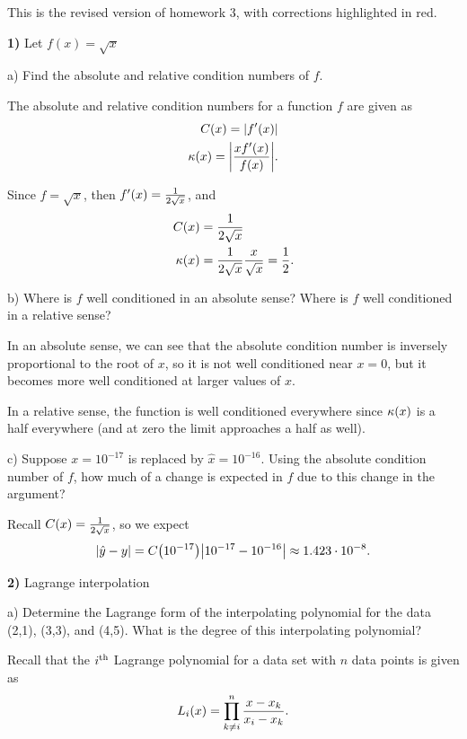 \documentclass[12pt,a4paper]{article}
\newcommand{\prob}[2]{\textbf{#1)} #2}
\begin{document}
This is the revised version of homework 3, with corrections highlighted in red.

\prob{1}{Let $f(x) = \sqrt{x}$}

a) Find the absolute and relative condition numbers of $f$.

The absolute and relative condition numbers for a function $f$ are given as
\begin{align*}
    C\qty(x) = \abs{f'\qty(x) } \\
    \kappa\qty(x) = \abs{\frac{xf'\qty(x)}{f\qty(x) }} 
.\end{align*}

Since 
    $f = \sqrt{x}$, 
then 
    $f'\qty(x) = \frac{1}{2 \sqrt{x}}$,
and
\begin{align*}
    C\qty(x) &= \frac{1}{2\sqrt{x}} \\
    \kappa\qty(x) &= \frac{1}{2\sqrt{x}}\frac{x}{\sqrt{x}} = \frac{1}{2}
.\end{align*}

b) Where is $f$ well conditioned in an absolute sense? Where is $f$ well conditioned in a relative sense?

In an absolute sense, we can see that the absolute condition number is inversely proportional to the root of $x$, so it is not well conditioned near $x = 0$, but it becomes more well conditioned at larger values of $x$.

In a relative sense, the function is well conditioned everywhere since $\kappa\qty(x)$ is a half everywhere (and at zero the limit approaches a half as well).

c) Suppose $x = 10^{-17}$ is replaced by $\hat{x} = 10^{-16}$. Using the absolute condition number of $f$, how much of a change is expected in $f$ due to this change in the argument?

Recall $C\qty(x) = \frac{1}{2\sqrt{x}}$, so we expect
\begin{align*}
    \abs{\hat{y} - y} = C\qty(10^{-17})\abs{10^{-17} - 10^{-16}} \approx 1.423 \cdot 10^{-8}
.\end{align*}

\prob{2}{Lagrange interpolation}

a) Determine the Lagrange form of the interpolating polynomial for the data (2,1), (3,3), and (4,5).
What is the degree of this interpolating polynomial?

Recall that the $i^{\rm th}$ Lagrange polynomial for a data set with $n$ data points is given as
\begin{align*}
    L_i\qty(x) = \prod_{k \ne i}^{n} \frac{x-x_k}{x_i-x_k}
.\end{align*}
\end{document}
